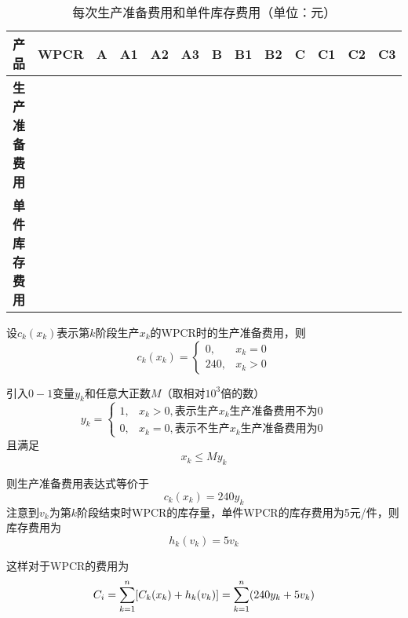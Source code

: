 \begin{table}[h]
    \renewcommand\arraystretch{1.5} 
    \centering
    \caption{每次生产准备费用和单件库存费用（单位：元）}
    \xiaowu
    \label{t.ch2-1}
    \begin{tabular}{|c|c|c|c|c|c|c|c|c|c|c|c|c|}
    \hline
     \textbf{产品} & \textbf{WPCR} & \textbf{A} & \textbf{A1} & \textbf{A2} & \textbf{A3} & \textbf{B} & \textbf{B1} & \textbf{B2} & \textbf{C} & \textbf{C1} & \textbf{C2} & \textbf{C3} \\ \hline
     \textbf{生产准备费用} &  &  &  &  &  &  &  &  &  &  &  &  \\ \hline
     \textbf{单件库存费用} &  &  &  &  &  &  &  &  &  &  &  &  \\ \hline
    \end{tabular}
\end{table}



设$c_k(x_k)$表示第$k$阶段生产$x_k$的WPCR时的生产准备费用，则
\begin{equation}
    c_k(x_k)=\begin{cases}
        0, & x_k=0\\
        240, & x_k>0
    \end{cases}
\end{equation}

引入$0-1$变量$y_k$和任意大正数$M$（取相对$10^3$倍的数）
\begin{equation}
    y_k=\begin{cases}
        1, & x_k>0,\text{表示生产}x_k\text{生产准备费用不为}0 \\
        0, & x_k=0,\text{表示不生产}x_k\text{生产准备费用为}0
    \end{cases}
\end{equation}
且满足
\begin{equation}
    x_k \leq My_k
\end{equation}

则生产准备费用表达式等价于
\begin{equation}
    c_k(x_k)=240y_k
\end{equation}
注意到$v_k$为第$k$阶段结束时WPCR的库存量，单件WPCR的库存费用为5元/件，则库存费用为
\begin{equation}
    h_k(v_k)=5v_k
\end{equation}

这样对于WPCR的费用为
\begin{equation}
    C_{\uppercase\expandafter{\romannumeral1}}=\sum_{k=1}^{n}[C_k(x_k)+h_k(v_k)]=\sum_{k=1}^{n}(240y_k+5v_k)
\end{equation}

